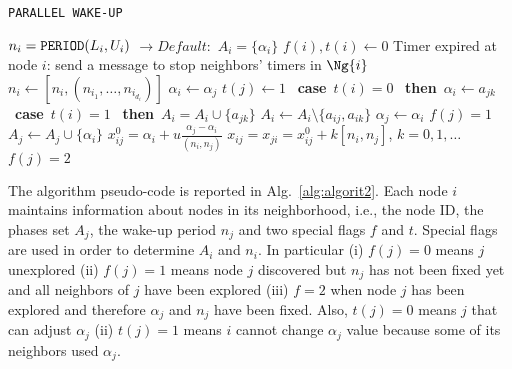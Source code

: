 \begin{algorithm}[t]
\caption{{\tt PARALLEL WAKE-UP}}\label{alg:algorit2}
\begin{algorithmic}[1]
\STATE $n_i=\mbox{{\tt PERIOD}}(L_i,U_i)$ $\rightarrow Default:$ $A_i=\{\alpha_i\}$ 
\STATE $f(i),t(i) \leftarrow 0$ 
\ENDFOR
{}
\STATE Timer expired at node $i$: send a message to stop neighbors' timers in $\Ng{i}$
\STATE $n_i\leftarrow [n_{i},(n_{i_1},\ldots,n_{i_{d_i}})]$ 
 \STATE $\alpha_i\leftarrow \alpha_j$ 
      \STATE $t(j)\leftarrow 1$  
  \STATE \mbox{ \bf case }$t(i)=0$ \mbox{ \bf then }$\alpha_i\leftarrow a_{jk} $  \STATE \mbox{ \bf case }$t(i)=1$ \mbox{ \bf then }$A_{i}=A_{i} \cup \{a_{jk}\}$ \STATE    $A_i \leftarrow A_i \setminus \{a_{ij},a_{ik}\}$ 
\ENDIF
{}
  \STATE $\alpha_j\leftarrow \alpha_i$       
  \STATE $f(j)=1$
  \STATE $A_{j}\leftarrow A_{j} \cup \{\alpha_i\}$       
\ENDIF  
\STATE $x_{ij}^0=\alpha_i+u \frac{\alpha_j-\alpha_i}{(n_i,n_j)}$
\STATE $x_{ij}=x_{ji}=x_{ij}^0+k [n_i,n_j]$, $k=0,1,\ldots$      
\STATE $f(j)=2$
\ENDFOR
\end{algorithmic}
\end{algorithm}


The algorithm pseudo-code is reported in Alg.~\ref{alg:algorit2}. Each node $i$ maintains information 
about nodes in its neighborhood, i.e., the node ID, the phases set $A_{j}$, the wake-up period $n_j$ 
and two special flags $f$ and $t$. Special flags are used in order to determine $A_i$ and $n_i$. In particular 
(i) $f(j)=0$ means $j$ unexplored (ii) $f(j)=1$ means node $j$ discovered but $n_j$ has not been fixed yet 
and all neighbors of $j$ have been explored (iii) $f=2$ when node $j$ has been explored and therefore 
$\alpha_j$ and $n_j$ have been fixed. Also, $t(j)=0$ means $j$ that can adjust $\alpha_j$ (ii) $t(j)=1$ means 
$i$ cannot change $\alpha_j$ value because some of its neighbors used $\alpha_j$. 

